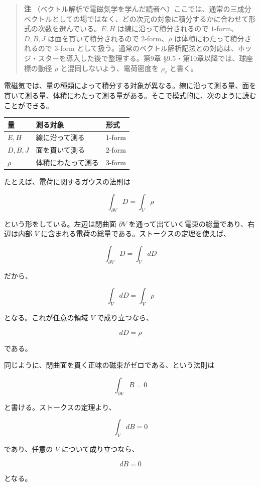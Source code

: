 \documentclass[a4paper,12pt,openany]{book}
\begin{document}
\begin{quote}
\textbf{注}
（ベクトル解析で電磁気学を学んだ読者へ）ここでは、通常の三成分ベクトルとしての場ではなく、どの次元の対象に積分するかに合わせて形式の次数を選んでいる。\(E,H\)
は線に沿って積分されるので \(1\)-form、\(D,B,J\)
は面を貫いて積分されるので \(2\)-form、\(\rho\)
は体積にわたって積分されるので \(3\)-form
として扱う。通常のベクトル解析記法との対応は、ホッジ・スターを導入した後で整理する。第9章
§9.5・第10章以降では、球座標の動径 \(\rho\) と混同しないよう、電荷密度を
\(\rho_{\mathrm e}\) と書く。
\end{quote}

電磁気では、量の種類によって積分する対象が異なる。線に沿って測る量、面を貫いて測る量、体積にわたって測る量がある。そこで模式的に、次のように読むことができる。

\begin{longtable}[]{@{}lll@{}}
\toprule\noalign{}
量 & 測る対象 & 形式 \\
\midrule\noalign{}
\endhead
\bottomrule\noalign{}
\endlastfoot
\(E,H\) & 線に沿って測る & \(1\)-form \\
\(D,B,J\) & 面を貫いて測る & \(2\)-form \\
\(\rho\) & 体積にわたって測る & \(3\)-form \\
\end{longtable}

たとえば、電荷に関するガウスの法則は

\[
\int_{\partial V}D=\int_V\rho
\]

という形をしている。左辺は閉曲面 \(\partial V\)
を通って出ていく電束の総量であり、右辺は内部 \(V\)
に含まれる電荷の総量である。ストークスの定理を使えば、

\[
\int_{\partial V}D=\int_V dD
\]

だから、

\[
\int_V dD=\int_V\rho
\]

となる。これが任意の領域 \(V\) で成り立つなら、

\[
dD=\rho
\]

である。

同じように、閉曲面を貫く正味の磁束がゼロである、という法則は

\[
\int_{\partial V}B=0
\]

と書ける。ストークスの定理より、

\[
\int_V dB=0
\]

であり、任意の \(V\) について成り立つなら、

\[
dB=0
\]

となる。
\end{document}
